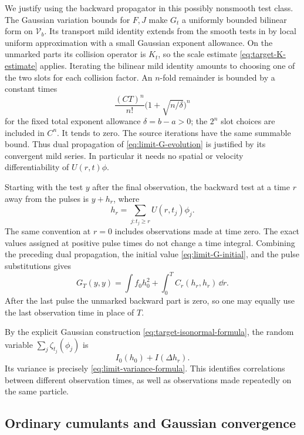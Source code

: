 We justify using the backward propagator in this possibly nonsmooth
test class.  The Gaussian variation bounds for \(F,J\) make \(G_t\)
a uniformly bounded bilinear form on \(\mathcal V_b\).
Its transport mild identity extends from the smooth
tests in  by local uniform approximation
with a small Gaussian exponent allowance.  On the unmarked parts its
collision operator is \(K_t\), so the scale estimate
\eqref{eq:target-K-estimate} applies.
Iterating the bilinear mild identity amounts to choosing one of the
two slots for each collision factor.  An \(n\)-fold remainder is
bounded by a constant times
\[
             \frac{(CT)^n}{n!}
                  \bigl(1+\sqrt{n/\delta}\bigr)^n
\]
for the fixed total exponent allowance \(\delta=b-a>0\); the \(2^n\)
slot choices are included in \(C^n\).  It tends to zero.
The source iterations have the same summable bound.
Thus dual propagation of \eqref{eq:limit-G-evolution} is justified
by its convergent mild series.  In particular it needs no spatial
or velocity differentiability of \(U(r,t)\phi\).

Starting with the test \(y\) after the final observation, the backward
test at a time \(r\) away from the pulses is \(y+h_r\), where
\begin{equation}\label{eq:limit-backward-pulse-test}
                   h_r=\sum_{j:t_j\ge r}U(r,t_j)\phi_j.
\end{equation}
The same convention at \(r=0\) includes observations made at time zero.
The exact values assigned at positive pulse times do not change a
time integral.  Combining the preceding dual propagation, the
initial value \eqref{eq:limit-G-initial}, and the pulse substitutions
gives
\begin{equation}\label{eq:limit-variance-formula}
                  G_T(y,y)
                  =\int f_0h_0^2
                         +\int_0^T C_r(h_r,h_r)\,\dd r.
\end{equation}
After the last pulse the unmarked backward part is zero, so one may
equally use the last observation time in place of \(T\).

By the explicit Gaussian construction
\eqref{eq:target-isonormal-formula}, the random variable
\(\sum_j\zeta_{t_j}(\phi_j)\) is
\[
                    I_0(h_0)+I(\Delta h_r).
\]
Its variance is precisely \eqref{eq:limit-variance-formula}.
This identifies correlations between different observation times,
as well as observations made repeatedly on the same particle.

\subsection{Ordinary cumulants and Gaussian convergence}


